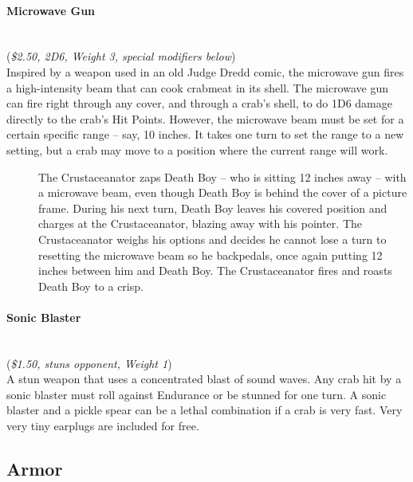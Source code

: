 \documentclass[a4paper,10pt]{article}
\begin{document}
\paragraph*{Microwave Gun}
\label{sec:MicrowaveGun}
\hspace*{0px}\\(\textit{\$2.50, 2D6, Weight 3, special modifiers below})\\
Inspired by a weapon used in an old Judge Dredd comic, the microwave gun fires a high-intensity beam that can cook crabmeat in its shell. The microwave gun can fire right through any cover, and through a crab's shell, to do 1D6 damage directly to the crab's Hit Points. However, the microwave beam must be set for a certain specific range -- say, 10 inches. It takes one turn to set the range to a new setting, but a crab may move to a position where the current range will work.

\begin{description}
 \item[] The Crustaceanator zaps Death Boy -- who is sitting 12 inches away -- with a microwave beam, even though Death Boy is behind the cover of a picture frame. During his next turn, Death Boy leaves his covered position and charges at the Crustaceanator, blazing away with his pointer. The Crustaceanator weighs his options and decides he cannot lose a turn to resetting the microwave beam so he backpedals, once again putting 12 inches between him and Death Boy. The Crustaceanator fires and roasts Death Boy to a crisp.
 \end{description}

\paragraph*{Sonic Blaster}
\label{sec:SonicBlaster}
\hspace*{0px}\\(\textit{\$1.50, stuns opponent, Weight 1})\\
A stun weapon that uses a concentrated blast of sound waves. Any crab hit by a sonic blaster must roll against Endurance or be stunned for one turn. A sonic blaster and a pickle spear can be a lethal combination if a crab is very fast. Very very tiny earplugs are included for free.

\subsection*{Armor}
\label{sec:Armor}
\end{document}
